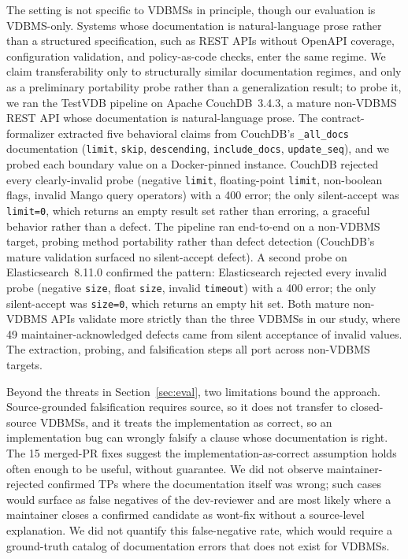 \documentclass[sigconf]{acmart}
\begin{document}
The setting is not specific to VDBMSs in principle, though our evaluation is VDBMS-only. Systems whose documentation is natural-language prose rather than a structured specification, such as REST APIs without OpenAPI coverage, configuration validation, and policy-as-code checks, enter the same regime. We claim transferability only to structurally similar documentation regimes, and only as a preliminary portability probe rather than a generalization result; to probe it, we ran the TestVDB pipeline on Apache CouchDB~3.4.3, a mature non-VDBMS REST API whose documentation is natural-language prose. The contract-formalizer extracted five behavioral claims from CouchDB's \texttt{\_all\_docs} documentation (\texttt{limit}, \texttt{skip}, \texttt{descending}, \texttt{include\_docs}, \texttt{update\_seq}), and we probed each boundary value on a Docker-pinned instance. CouchDB rejected every clearly-invalid probe (negative \texttt{limit}, floating-point \texttt{limit}, non-boolean flags, invalid Mango query operators) with a 400 error; the only silent-accept was \texttt{limit=0}, which returns an empty result set rather than erroring, a graceful behavior rather than a defect. The pipeline ran end-to-end on a non-VDBMS target, probing method portability rather than defect detection (CouchDB's mature validation surfaced no silent-accept defect). A second probe on Elasticsearch~8.11.0 confirmed the pattern: Elasticsearch rejected every invalid probe (negative \texttt{size}, float \texttt{size}, invalid \texttt{timeout}) with a 400 error; the only silent-accept was \texttt{size=0}, which returns an empty hit set. Both mature non-VDBMS APIs validate more strictly than the three VDBMSs in our study, where 49 maintainer-acknowledged defects came from silent acceptance of invalid values. The extraction, probing, and falsification steps all port across non-VDBMS targets.

Beyond the threats in Section~\ref{sec:eval}, two limitations bound the approach. Source-grounded falsification requires source, so it does not transfer to closed-source VDBMSs, and it treats the implementation as correct, so an implementation bug can wrongly falsify a clause whose documentation is right. The 15 merged-PR fixes suggest the implementation-as-correct assumption holds often enough to be useful, without guarantee. We did not observe maintainer-rejected confirmed TPs where the documentation itself was wrong; such cases would surface as false negatives of the dev-reviewer and are most likely where a maintainer closes a confirmed candidate as wont-fix without a source-level explanation. We did not quantify this false-negative rate, which would require a ground-truth catalog of documentation errors that does not exist for VDBMSs.
\end{document}
